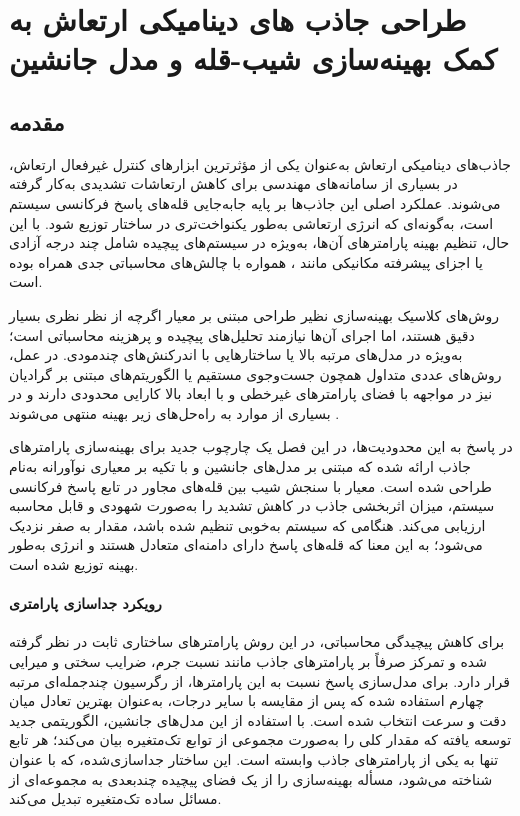 \chapter{طراحی جاذب های دینامیکی ارتعاش به کمک بهینه‌سازی شیب-قله و مدل جانشین}

\section{مقدمه}

جاذب‌های دینامیکی ارتعاش
به‌عنوان یکی از مؤثرترین ابزارهای کنترل غیرفعال ارتعاش، در بسیاری از سامانه‌های مهندسی برای کاهش ارتعاشات تشدیدی به‌کار گرفته می‌شوند. عملکرد اصلی این جاذب‌ها بر پایه جابه‌جایی قله‌های پاسخ فرکانسی سیستم است، به‌گونه‌ای که انرژی ارتعاشی به‌طور یکنواخت‌تری در ساختار توزیع شود. با این حال، تنظیم بهینه پارامترهای آن‌ها، به‌ویژه در سیستم‌های پیچیده شامل چند درجه آزادی یا اجزای پیشرفته مکانیکی مانند
، همواره با چالش‌های محاسباتی جدی همراه بوده است.

روش‌های کلاسیک بهینه‌سازی نظیر طراحی مبتنی بر معیار
اگرچه از نظر نظری بسیار دقیق هستند، اما اجرای آن‌ها نیازمند تحلیل‌های پیچیده و پرهزینه محاسباتی است؛ به‌ویژه در مدل‌های مرتبه بالا یا ساختارهایی با اندرکنش‌های چندمودی. در عمل، روش‌های عددی متداول همچون جست‌وجوی مستقیم یا الگوریتم‌های مبتنی بر گرادیان نیز در مواجهه با فضای پارامترهای غیرخطی و با ابعاد بالا کارایی محدودی دارند و در بسیاری از موارد به راه‌حل‌های زیر بهینه منتهی می‌شوند \cite{chang1980structural, housner1997structural}.

در پاسخ به این محدودیت‌ها، در این فصل یک چارچوب جدید برای بهینه‌سازی پارامترهای جاذب ارائه شده که مبتنی بر مدل‌های جانشین و با تکیه بر معیاری نوآورانه به‌نام  طراحی شده است. معیار
با سنجش شیب بین قله‌های مجاور در تابع پاسخ فرکانسی سیستم، میزان اثربخشی جاذب در کاهش تشدید را به‌صورت شهودی و قابل محاسبه ارزیابی می‌کند. هنگامی که سیستم به‌خوبی تنظیم شده باشد، مقدار
به صفر نزدیک می‌شود؛ به این معنا که قله‌های پاسخ دارای دامنه‌ای متعادل هستند و انرژی به‌طور بهینه توزیع شده است.

\subsubsection{رویکرد جداسازی پارامتری}
برای کاهش پیچیدگی محاسباتی، در این روش پارامترهای ساختاری ثابت در نظر گرفته شده و تمرکز صرفاً بر پارامترهای جاذب مانند نسبت جرم، ضرایب سختی و میرایی قرار دارد. برای مدل‌سازی پاسخ
نسبت به این پارامترها، از رگرسیون چندجمله‌ای مرتبه چهارم استفاده شده که پس از مقایسه با سایر درجات، به‌عنوان بهترین تعادل میان دقت و سرعت انتخاب شده است. با استفاده از این مدل‌های جانشین، الگوریتمی جدید توسعه یافته که مقدار کلی
را به‌صورت مجموعی از توابع تک‌متغیره بیان می‌کند؛ هر تابع تنها به یکی از پارامترهای جاذب وابسته است. این ساختار جداسازی‌شده، که با عنوان  شناخته می‌شود، مسأله بهینه‌سازی را از یک فضای پیچیده چندبعدی به مجموعه‌ای از مسائل ساده تک‌متغیره تبدیل می‌کند.

